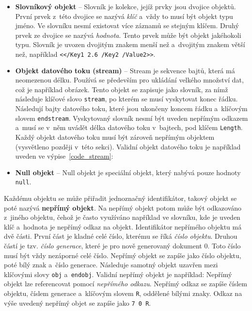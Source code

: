 \begin{itemize}
    \item \textbf{Slovníkový objekt} -- Slovník je kolekce, jejíž prvky jsou
    dvojice objektů. První prvek z~této dvojice se nazývá \emph{klíč} a~vždy to 
    musí být objekt typu jméno. Ve slovníku nesmí existovat více záznamů se
    stejným klíčem. Druhý prvek ze dvojice se nazývá \emph{hodnota}.
    Tento prvek může být objekt jakéhokoli typu. Slovník je uvozen dvojitým znakem
    menší než a~dvojitým znakem větší než, například
    \texttt{<</Key1 2.6 /Key2 /Value2>>}.

    \item \textbf{Objekt datového toku (stream)} -- Stream je sekvence bajtů, 
    která má neomezenou délku. Používá se především pro ukládání velkého množství
    dat, což je například obrázek. Tento objekt se zapisuje jako slovník, za nímž
    následuje klíčové slovo \texttt{stream}, po kterém se musí vyskytovat konec
    řádku. Následují bajty datového toku, které jsou ukončeny koncem řádku
    a~klíčovým slovem \texttt{endstream}. Vyskytovaný slovník nesmí být uveden
    nepřímým odkazem a~musí se v~něm uvádět délka datového toku v~bajtech, pod
    klíčem \texttt{Length}. Každý objekt datového toku musí být zároveň nepřímým
    objektem (vysvětleno později v~této sekci). Validní objekt datového toku je
    například uveden ve výpise~\ref{code_stream}:

    \item \textbf{Null objekt} -- Null objekt je speciální objekt, který nabývá
    pouze hodnoty \texttt{null}.
\end{itemize}

Každému objektu se může přiřadit jednoznačný identifikátor, takový objekt se poté
nazývá \textbf{nepřímý objekt}. Na nepřímý objekt potom může být odkazováno
z~jiného objektu, čehož je často využíváno například ve slovníku, kde je uveden
klíč a~hodnota je nepřímý odkaz na objekt. Identifikátor nepřímého objektu má dvě
části. První část je kladné celé číslo, kterému se říká \emph{číslo objektu}.
Druhou částí je tzv. \emph{číslo generace}, které je pro nově generovaný dokument
0. Toto číslo musí být vždy nezáporné celé číslo. Nepřímý objekt se zapíše jako
číslo objektu, poté bílý znak a~číslo generace. Následuje samotný objekt uzavřen
mezi klíčovými slovy \texttt{obj} a~\texttt{endobj}. Validní nepřímý objekt je
například:
\noindent Nepřímý objekt lze referencovat pomocí \emph{nepřímého odkazu}.
Nepřímý odkaz se zapíše číslem objektu, číslem generace a~klíčovým slovem
\texttt{R}, oddělené bílými znaky. Odkaz na výše uvedený nepřímý objet se zapíše
jako \texttt{7 0 R}.


